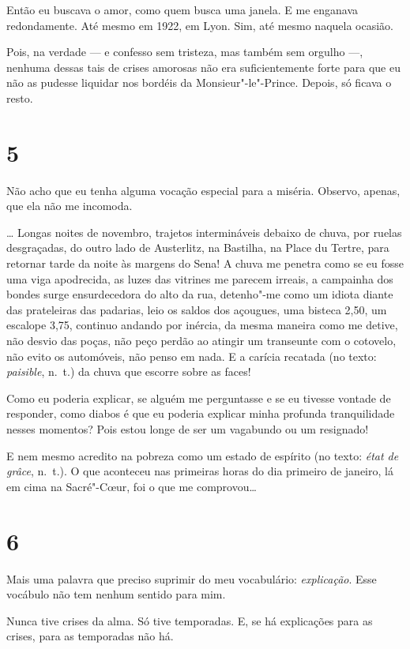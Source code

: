 Então eu buscava o amor, como quem busca uma janela. E me enganava
redondamente. Até mesmo em 1922, em Lyon. Sim, até mesmo naquela
ocasião.

Pois, na verdade --- e confesso sem tristeza, mas também sem orgulho ---,
nenhuma dessas tais de crises amorosas não era suficientemente forte
para que eu não as pudesse liquidar nos bordéis da Monsieur"-le"-Prince.
Depois, só ficava o resto.

\section{5}

Não acho que eu tenha alguma vocação especial para a miséria. Observo,
apenas, que ela não me incomoda.

\ldots{} Longas noites de novembro, trajetos intermináveis debaixo de
chuva, por ruelas desgraçadas, do outro lado de Austerlitz, na Bastilha,
na Place du Tertre, para retornar tarde da noite às margens do Sena! A
chuva me penetra como se eu fosse uma viga apodrecida, as luzes das
vitrines me parecem irreais, a campainha dos bondes surge ensurdecedora
do alto da rua, detenho"-me como um idiota diante das prateleiras das
padarias, leio os saldos dos açougues, uma bisteca 2,50, um escalope
3,75, continuo andando por inércia, da mesma maneira como me detive, não
desvio das poças, não peço perdão ao atingir um transeunte com o
cotovelo, não evito os automóveis, não penso em nada. E a carícia
recatada (no texto: \emph{paisible}, n.~t.) da chuva que escorre sobre as
faces!

Como eu poderia explicar, se alguém me perguntasse e se eu tivesse
vontade de responder, como diabos é que eu poderia explicar minha
profunda tranquilidade nesses momentos? Pois estou longe de ser um
vagabundo ou um resignado!

E nem mesmo acredito na pobreza como um estado de espírito (no texto:
\emph{état de grâce}, n.~t.). O que aconteceu nas primeiras horas do dia
primeiro de janeiro, lá em cima na Sacré"-C\oe ur, foi o que me
comprovou\ldots{}

\section{6}

Mais uma palavra que preciso suprimir do meu vocabulário:
\emph{explicação}. Esse vocábulo não tem nenhum sentido para mim.

Nunca tive crises da alma. Só tive temporadas. E, se há explicações para
as crises, para as temporadas não há.

